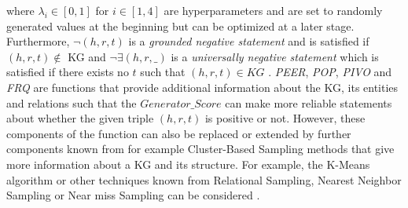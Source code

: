 where $\lambda_i \in [0, 1]$ for $i \in [1,4]$ are hyperparameters and are set to randomly generated values at the beginning but can be optimized at a later stage.
Furthermore, $\neg (h, r, t)$ is a \textit{grounded negative statement} and is satisfied if $(h, r, t) \notin$ \ac{KG} and $\neg\exists(h, r, \_)$ is a \textit{universally negative statement} which is satisfied if there exists no $t$ such that $(h, r, t) \in KG$ \cite{arnaout2020enriching}.
\textit{PEER}, \textit{POP}, \textit{PIVO} and \textit{FRQ} are functions that provide additional information about the \ac{KG}, its entities and relations such that the $Generator\_Score$ can make more reliable statements about whether the given triple $(h, r, t)$ is positive or not.
However, these components of the function can also be replaced or extended by further components known from for example Cluster-Based Sampling methods that give more information about a \ac{KG} and its structure.
For example, the K-Means algorithm \cite{qianunderstanding} or other techniques known from Relational Sampling, Nearest Neighbor Sampling or Near miss Sampling can be considered \cite{kotnis2017analysis}.

